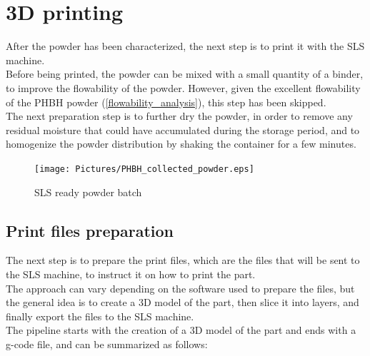 \documentclass{article}
\begin{document}
    \clearpage
    \section{3D printing\label{SLS_printing_experimental}}

    After the powder has been characterized, the next step is to print it with the SLS machine. \\

    Before being printed, the powder can be mixed with a small quantity of a binder, to improve the flowability of the powder. 
    However, given the excellent flowability of the PHBH powder (\ref{flowability_analysis}), this step has been skipped. \\

    The next preparation step is to further dry the powder, in order to remove any residual moisture
    that could have accumulated during the storage period, and to homogenize the powder distribution 
    by shaking the container for a few minutes. \\

                \begin{figure}[h!]
                    \centering
                    \texttt{[image: Pictures/PHBH\_collected\_powder.eps]}
                    \caption{SLS ready powder batch}
                    \label{fig:PHBH_collected_powder}
                    
                \end{figure}

        \subsection{Print files preparation\label{Print_files_preparation}}

        The next step is to prepare the print files, which are the files that will be sent to the SLS machine, 
        to instruct it on how to print the part. \\

        The approach can vary depending on the software used to prepare the files, but the general idea is to 
        create a 3D model of the part, then slice it into layers, and finally export the files to the SLS machine. \\

        The pipeline starts with the creation of a 3D model of the part and ends with a g-code file, and can 
        be summarized as follows: 
        
\end{document}
